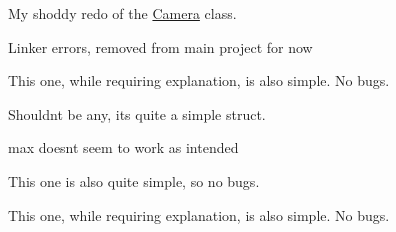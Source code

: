 
\begin{DoxyRefList}
\item[\label{bug__bug000006}%
\hypertarget{bug__bug000006}{}%
Class \hyperlink{class_main_game}{Main\+Game} ]My shoddy redo of the \hyperlink{class_camera}{Camera} class.  
\item[\label{bug__bug000007}%
\hypertarget{bug__bug000007}{}%
Class \hyperlink{class_physiscs___wrapper_1_1h}{Physiscs\+\_\+\+Wrapper\+:\+:h} ]Linker errors, removed from main project for now  
\item[\label{bug__bug000005}%
\hypertarget{bug__bug000005}{}%
Class \hyperlink{structtypes_1_1_matrix4x4}{types\+:\+:Matrix4x4} ]This one, while requiring explanation, is also simple. No bugs.  
\item[\label{bug__bug000001}%
\hypertarget{bug__bug000001}{}%
Class \hyperlink{structtypes_1_1_vector2_d}{types\+:\+:Vector2\+D} ]Shouldn\textquotesingle{}t be any, it\textquotesingle{}s quite a simple struct.  
\item[\label{bug__bug000002}%
\hypertarget{bug__bug000002}{}%
Class \hyperlink{structtypes_1_1_vector3_d}{types\+:\+:Vector3\+D} ]max doesn\textquotesingle{}t seem to work as intended

This one is also quite simple, so no bugs.  
\item[\label{bug__bug000004}%
\hypertarget{bug__bug000004}{}%
Class \hyperlink{structtypes_1_1_vector4_d}{types\+:\+:Vector4\+D} ]This one, while requiring explanation, is also simple. No bugs. 
\end{DoxyRefList}